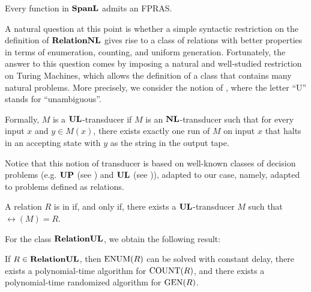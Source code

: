 \documentclass[11pt,twoside=off,numbers=noenddot]{scrbook}
\begin{document}
\begin{corollary}
    Every function in $\textbf{SpanL}$ admits an FPRAS.
\end{corollary}

A natural question at this point is whether a simple syntactic restriction on the definition of $\textbf{RelationNL}$ gives rise to a class of relations with better properties in terms of enumeration, counting, and uniform generation. Fortunately, the answer to this question comes by imposing a natural and well-studied restriction on Turing Machines, which allows the definition of a class that contains many natural problems. More precisely, we consider the notion of , where the letter ``U'' stands for ``unambiguous''.

\begin{definition}[$\UL$-transducer]
    Formally, $M$ is a $\UL$-transducer if $M$ is an $\textbf{NL}$-transducer such that for every input $x$ and $y \in M(x)$, there exists exactly one run of $M$ on input $x$ that halts in an accepting state with $y$ as the string in the output tape.
\end{definition}

Notice that this notion of transducer is based on well-known classes of decision problems (e.g. $\textbf{UP}$ (see \cite{valiant1976relative}) and $\UL$ (see \cite{reinhardt2000making})), adapted to our case, namely, adapted to problems defined as relations.

\begin{definition}[$\RelationUL$]
    A relation $R$ is in \vocab{$\RelationUL$} if, and only if, there exists a $\UL$-transducer $M$ such that $\rel(M) = R$.
\end{definition}

For the class $\RelationUL$, we obtain the following result:

\begin{theorem}
    If $R \in \textbf{RelationUL}$, then $\text{ENUM}(R)$ can be solved with constant delay, there exists a polynomial-time algorithm for $\text{COUNT}(R)$, and there exists a polynomial-time randomized algorithm for $\text{GEN}(R)$.
\end{theorem}
\end{document}
